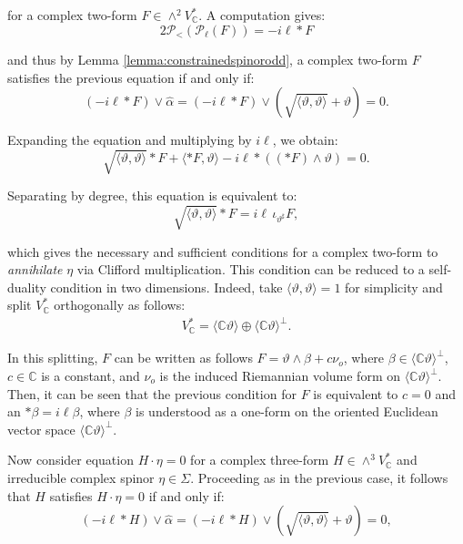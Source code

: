 \documentclass[10pt,a4paper,twoside,reqno]{amsart}
\theoremstyle{plain}
\theoremstyle{definition}
\theoremstyle{remark}
\def\C{\mathbb{C}}
\def\cP{\mathcal{P}}
\def\cP{\mathcal{P}}
\newcommand{\escal}[1]{\langle#1\rangle}
\begin{document}
\noindent
for a complex two-form $F\in \wedge^2 V^{\ast}_{\mathbb{C}}$. A computation gives:
\begin{equation*}
2\cP_<(\cP_\ell(F))=-i\ell*F
\end{equation*} 

\noindent
and thus by Lemma \ref{lemma:constrainedspinorodd}, a complex two-form $F$ satisfies the previous equation if and only if:
\begin{equation*}
\textstyle (-i\ell *F)\vee\widehat{\alpha}=(-i\ell*F)\vee(\sqrt{\escal{\vartheta,\vartheta}}+\vartheta)=0.
\end{equation*}

\noindent
Expanding the equation and multiplying by $i\ell$, we obtain:
\begin{equation*}
\textstyle \sqrt{\escal{\vartheta,\vartheta}} *F +\escal{*F,\vartheta}-i\ell*((*F)\wedge\vartheta)=0.    
\end{equation*}
 
\noindent
Separating by degree, this equation is equivalent to:
\begin{equation*}
\textstyle \sqrt{\escal{\vartheta,\vartheta}} \ast F  =  i\ell\,\iota_{\vartheta^\sharp}F,
\end{equation*}

\noindent
which gives the necessary and sufficient conditions for a complex two-form to \emph{annihilate} $\eta$ via Clifford multiplication. This condition can be reduced to a self-duality condition in two dimensions. Indeed, take $\escal{\vartheta,\vartheta} = 1$ for simplicity and split $V_\C^{\ast}$ orthogonally as follows:
\begin{eqnarray*}
V_\C^{\ast} = \langle \mathbb{C} \vartheta \rangle \oplus \langle \mathbb{C} \vartheta \rangle^{\perp}.
\end{eqnarray*}

\noindent
In this splitting, $F$ can be written as follows $F = \vartheta\wedge \beta + c \nu_o$, where $\beta\in \langle \mathbb{C} \vartheta \rangle^{\perp}$, $c\in \mathbb{C}$ is a constant, and $\nu_o$ is the induced Riemannian volume form on $\langle \mathbb{C} \vartheta \rangle^{\perp}$. Then, it can be seen that the previous condition for $F$ is equivalent to $c=0$ and an $\ast\beta = i\ell \beta$, where $\beta$ is understood as a one-form on the oriented Euclidean vector space $\langle \mathbb{C} \vartheta \rangle^{\perp}$.
\medskip

Now consider equation $H\cdot\eta=0$ for a complex three-form $H\in\wedge^3V_\C^*$ and irreducible complex spinor $\eta\in \Sigma$. Proceeding as in the previous case, it follows that $H$ satisfies $H\cdot\eta=0$ if and only if:
\begin{equation*}
\textstyle (-i\ell *H)\vee\widehat{\alpha}=(-i\ell*H)\vee(\sqrt{\escal{\vartheta,\vartheta}}+\vartheta)=0,
\end{equation*}
\end{document}
